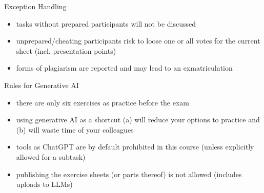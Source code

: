 \begin{frame}{\insertsubsection}
	\begin{fancycolumns}[widths={40}]
		\begin{note}{Exception Handling}
			\begin{itemize}
				\item tasks without prepared participants will not be discussed
				\item unprepared/cheating participants risk to loose one or all votes for the current sheet (incl. presentation points)
				\item forms of plagiarism are reported and may lead to an exmatriculation
			\end{itemize}
		\end{note}
		\nextcolumn
		\begin{note}{Rules for Generative AI}
			\begin{itemize}
				\item there are only six exercises as practice before the exam
				\item using generative AI as a shortcut (a) will reduce your options to practice and (b) will waste time of your colleagues
				\item tools as ChatGPT are by default prohibited in this course (unless explicitly allowed for a subtask)
				\item publishing the exercise sheets (or parts thereof) is not allowed (includes uploads to LLMs)
			\end{itemize}
		\end{note}
	\end{fancycolumns}
\end{frame}

